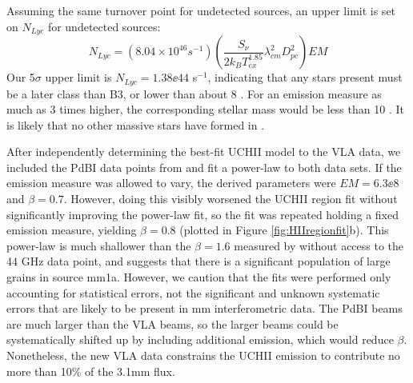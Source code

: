 Assuming the same turnover point for undetected sources,  
an upper limit is set on $N_{Lyc}$ for undetected sources:
\begin{equation}
  N_{Lyc} = (8.04\times10^{46} s^{-1}) \left(\frac{S_\nu }{  2 k_B T_{ex}^{1.85} }  \lambda_{cm}^2  D_{pc}^2\right) EM
\end{equation}
Our 5$\sigma$ upper limit is $N_{Lyc} = 1.38\ee{44}$ s$^{-1}$, indicating that
any stars present must be a later class than B3, or lower than about 8 \msun .  
For an emission measure as much as 3 times higher, the corresponding stellar
mass would be less than 10 \msun .  It is likely that no other massive
stars have formed in \necluster.

After independently determining the best-fit UCHII model to the VLA data, we
included the PdBI data points from \citet{beuther2007} and fit a power-law to
both data sets.  If the emission measure was allowed to vary, the derived
parameters were $EM=6.3\ee{8}$ and $\beta=0.7$.  However, doing this visibly
worsened the UCHII region fit without significantly improving the power-law
fit, so the fit was repeated holding a fixed emission measure, yielding
$\beta=0.8$ (plotted in Figure \ref{fig:HIIregionfit}b).  This power-law is
much shallower than the $\beta=1.6$ measured by \citet{beuther2007} without
access to the 44 GHz data point, and suggests that there is a significant
population of large grains in source mm1a.  However, we caution that the fits
were performed only accounting for statistical errors, not the significant and
unknown systematic errors that are likely to be present in mm interferometric
data.  The PdBI beams are much larger than the VLA beams, so the larger beams
could be systematically shifted up by including additional emission, which
would reduce $\beta$.  Nonetheless, the new VLA data constrains the UCHII
emission to contribute no more than 10\% of the 3.1mm flux.

\begin{figure*}[htpb]
\caption{(a) The HII region fit to measured X, K, U, and Q band data.  Error bars
represent statistical error in the flux measurement.  The Q band error is
dominated by flux calibration uncertainty (see Table \ref{tab:vlatimes}).  The
measured turnover is at 9.5 GHz. (b) A fit to both the VLA data presented in this paper
and the (sub)mm points from \citet{beuther2007}.  The best fit spectral index for the 
dust emission is $\alpha=2.8$ ($\beta=0.8$), significantly lower than the $\alpha=3.6$
measured by \citet{beuther2007} without the 0.7 mm data point.}
\label{fig:HIIregionfit}
\end{figure*}


